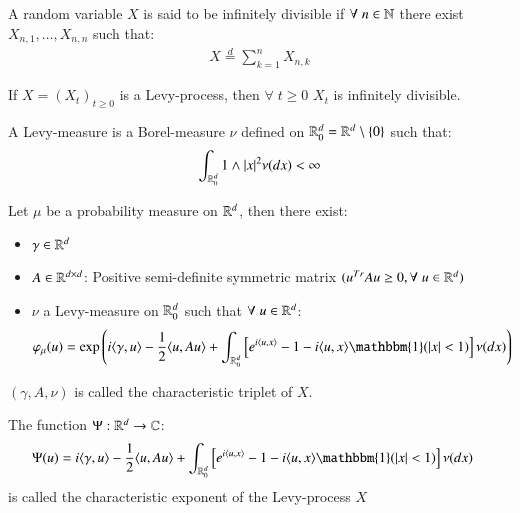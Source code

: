 \begin{definition}
A random variable $X$ is said to be infinitely divisible if $\forall\; n\in \mathbb{N}$ there exist $X_{n,1}, \dots, X_{n,n}$ such that: 
\begin{align*}
X \stackrel{d}{=} \sum_{k=1}^{n}X_{n,k}
\end{align*}
\end{definition}

\begin{proposition}
If $X = (X_{t})_{t\geq 0}$ is a Levy-process, then $\forall\; t\geq 0$ $X_{t}$ is infinitely divisible. 
\end{proposition}

\begin{definition}
A Levy-measure is a Borel-measure  $\nu$  defined on $\mathbb{R}_{0}^{d} = \mathbb{R}^{d}\setminus \{0\}$ 
such that: 
\begin{align*}
\int_{\mathbb{R}_{0}^{d}}1\wedge|x|^{2}\nu(dx) < \infty    
\end{align*}
\end{definition}

\begin{theorem}
\label{thm: Levy_Khintchine}
Let $\mu$ be a probability measure on $\mathbb{R}^{d}$, then there exist: 
\begin{itemize}[leftmargin =*]
    \item $\gamma \in \mathbb{R}^{d}$
    \item $A \in \mathbb{R}^{d\times d}$: Positive semi-definite symmetric matrix $(u^{Tr}Au \geq 0, \forall\; u\in \mathbb{R}^{d})$ 
    \item $\nu$ a Levy-measure on $\mathbb{R}_{0}^{d}$ such that $\forall \; u \in \mathbb{R}^{d}$: 
    \begin{align*}
    \varphi_{\mu}(u) &= \exp\left(
    i\langle \gamma, u \rangle - \frac{1}{2}\langle u, Au \rangle 
    + \int_{\R_{0}^{d}}\left[
    e^{i \langle u, x\rangle} - 1 - i\langle u, x\rangle\mathbbm{1}(|x|<1)
    \right]\nu(dx)
    \right)
    \end{align*}
\end{itemize}
$(\gamma, A, \nu)$ is called the characteristic triplet of $X$. 
\end{theorem} 

\newpage 

\begin{definition}
The function $\Psi: \mathbb{R}^{d} \to \mathbb{C}$: 
\begin{align*}
\Psi(u) &= i\langle \gamma, u \rangle - \frac{1}{2}\langle u, Au \rangle 
    + \int_{\R_{0}^{d}}\left[
    e^{i \langle u, x\rangle} - 1 - i\langle u, x\rangle\mathbbm{1}(|x|<1)
    \right]\nu(dx)    
\end{align*}
is called the characteristic exponent of the Levy-process $X$
\end{definition}



